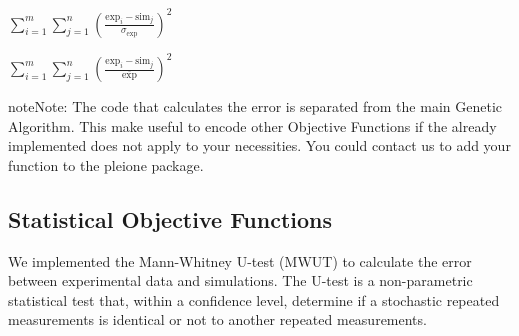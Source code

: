\documentclass[letterpaper,10pt,english]{sphinxmanual}
\begin{document}
\begin{itemize}
\item {} 
\begin{DUlineblock}{0em}
\item[] 
\item[] 
\item[]
\begin{DUlineblock}{\DUlineblockindent}
\item[] \(\sum_{i=1}^{m} \sum_{j=1}^{n} \left( \frac{ \mathrm{exp}_i - \mathrm{sim}_j }{ \sigma_{\mathrm{exp}} } \right)^{2}\)
\end{DUlineblock}
\end{DUlineblock}

\item {} 
\begin{DUlineblock}{0em}
\item[] 
\item[] 
\item[]
\begin{DUlineblock}{\DUlineblockindent}
\item[] \(\sum_{i=1}^{m} \sum_{j=1}^{n} \left( \frac{ \mathrm{exp}_i - \mathrm{sim}_j }{ \overline{\mathrm{exp}} } \right)^{2}\)
\end{DUlineblock}
\end{DUlineblock}

\end{itemize}

\begin{sphinxadmonition}{note}{Note:}
 The code that calculates the error
is separated from the main Genetic Algorithm. This make useful to encode
other Objective Functions if the already implemented does not apply to your
necessities. You could contact us to add your function to the pleione
package.
\end{sphinxadmonition}


\subsection{Statistical Objective Functions}
\label{\detokenize{functions/statistical:statistical-objective-functions}}\label{\detokenize{functions/statistical::doc}}
We implemented the Mann-Whitney U-test (MWUT) to calculate the error between
experimental data and simulations. The U-test is a non-parametric statistical
test that, within a confidence level, determine if a stochastic repeated
measurements is identical or not to another repeated measurements.
\end{document}
